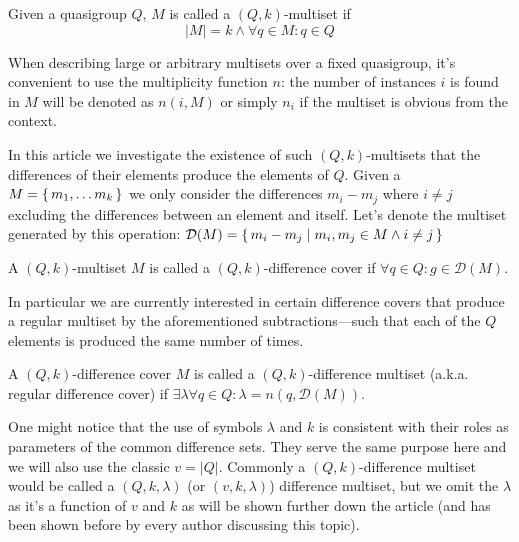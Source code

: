 \begin{definition}
    \label{dms:def:ms}
    Given a quasigroup $Q$, $M$ is called a $(Q,k)$-multiset if
    \begin{equation}
        |M| = k \land \forall q \in M \colon q \in Q
    \end{equation}
\end{definition}

When describing large or arbitrary multisets over a fixed quasigroup, it's convenient to use the multiplicity function $n$: the number of instances $i$ is found in $M$ will be denoted as $n(i,M)$ or simply $n_i$ if the multiset is obvious from the context.

In this article we investigate the existence of such $(Q,k)$-multisets that the differences of their elements produce the elements of $Q$. Given a $M=\set{m_1,\ldots m_k}$ we only consider the differences $m_i-m_j$ where $i \neq j$ excluding the differences between an element and itself. Let's denote the multiset generated by this operation: $\mathcal D (M) = \set{m_i-m_j \mid m_i, m_j \in M \land i \neq j}$

\begin{definition}
    \label{dms:def:dc}
    A $(Q,k)$-multiset $M$ is called a $(Q,k)$-difference cover if $\forall q \in Q \colon g \in \mathcal D(M)$.
\end{definition}

In particular we are currently interested in certain difference covers that produce a regular multiset by the aforementioned subtractions---such that each of the $Q$ elements is produced the same number of times.

\begin{definition}
    \label{dms:def:dms}
    A $(Q,k)$-difference cover $M$ is called a $(Q,k)$-difference multiset (a.k.a. regular difference cover) if $\exists \lambda  \forall q \in Q \colon \lambda = n(q, \mathcal D(M))$.
\end{definition}

One might notice that the use of symbols $\lambda$ and $k$ is consistent with their roles as parameters of the common difference sets. They serve the same purpose here and we will also use the classic $v = |Q|$. Commonly a $(Q,k)$-difference multiset would be called a $(Q,k,\lambda)$ (or $(v,k,\lambda)$) difference multiset, but we omit the $\lambda$ as it's a function of $v$ and $k$ as will be shown further down the article (and has been shown before by every author discussing this topic).

